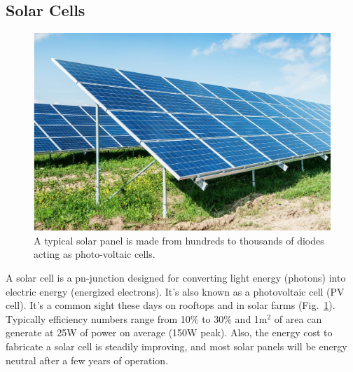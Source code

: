 \subsection{Solar Cells}
\begin{figure}[tb]
\centering
\includegraphics[width=.5\columnwidth]{solar_cell.jpg}
\caption{A typical solar panel is made from hundreds to thousands of diodes acting as photo-voltaic cells.}
\label{fig:solar_cell}
\end{figure}
A solar cell is a pn-junction designed for converting light energy (photons) into electric energy (energized electrons).  It's also known as a photovoltaic cell (PV cell).  It's a common sight these days on rooftops and in solar farms (Fig.~\ref{fig:solar_cell}).   Typically efficiency numbers range from 10\% to 30\% and 1m$^2$ of area can generate at 25W of power on average (150W peak).  Also, the energy cost to fabricate a solar cell is steadily improving, and most solar panels will be energy neutral after a few years of operation.
